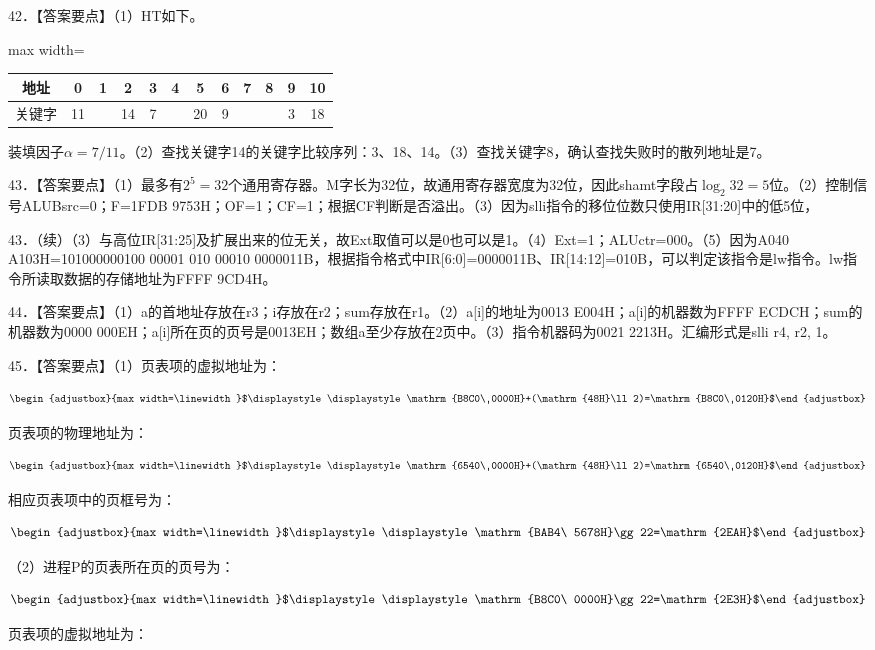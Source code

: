 \documentclass[UTF8,11pt]{ctexart}
\newcommand{\fitmath}[1]{\begin{adjustbox}{max width=\linewidth}$\displaystyle #1$\end{adjustbox}}
\begin{document}
42．【答案要点】（1）HT如下。


\begin{center}\begin{adjustbox}{max width=\linewidth}\begin{tabular}{|c|c|c|c|c|c|c|c|c|c|c|c|}\hline
地址 & 0 & 1 & 2 & 3 & 4 & 5 & 6 & 7 & 8 & 9 & 10\\\hline
关键字 & 11 &  & 14 & 7 &  & 20 & 9 &  &  & 3 & 18\\\hline\end{tabular}\end{adjustbox}\end{center}

装填因子\(\displaystyle \alpha=7/11\)。（2）查找关键字14的关键字比较序列：3、18、14。（3）查找关键字8，确认查找失败时的散列地址是7。


43．【答案要点】（1）最多有\(\displaystyle 2^5=32\)个通用寄存器。M字长为32位，故通用寄存器宽度为32位，因此shamt字段占\(\displaystyle \log_2 32=5\)位。（2）控制信号ALUBsrc=0；F=1FDB 9753H；OF=1；CF=1；根据CF判断是否溢出。（3）因为slli指令的移位位数只使用IR[31:20]中的低5位，


43．（续）（3）与高位IR[31:25]及扩展出来的位无关，故Ext取值可以是0也可以是1。（4）Ext=1；ALUctr=000。（5）因为A040 A103H=101000000100 00001 010 00010 0000011B，根据指令格式中IR[6:0]=0000011B、IR[14:12]=010B，可以判定该指令是lw指令。lw指令所读取数据的存储地址为FFFF 9CD4H。


44．【答案要点】（1）a的首地址存放在r3；i存放在r2；sum存放在r1。（2）a[i]的地址为0013 E004H；a[i]的机器数为FFFF ECDCH；sum的机器数为0000 000EH；a[i]所在页的页号是0013EH；数组a至少存放在2页中。（3）指令机器码为0021 2213H。汇编形式是slli r4, r2, 1。


45．【答案要点】（1）页表项的虚拟地址为：


\[\fitmath{\displaystyle \mathrm{B8C0\ 0000H}+(\mathrm{48H}\ll2)=\mathrm{B8C0\ 0120H}}\]

页表项的物理地址为：


\[\fitmath{\displaystyle \mathrm{6540\ 0000H}+(\mathrm{48H}\ll2)=\mathrm{6540\ 0120H}}\]

相应页表项中的页框号为：


\[\fitmath{\displaystyle \mathrm{BAB4\ 5678H}\gg22=\mathrm{2EAH}}\]

（2）进程P的页表所在页的页号为：


\[\fitmath{\displaystyle \mathrm{B8C0\ 0000H}\gg22=\mathrm{2E3H}}\]

页表项的虚拟地址为：
\end{document}
